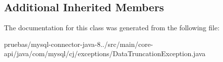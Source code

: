\subsection*{Additional Inherited Members}


The documentation for this class was generated from the following file\+:\begin{DoxyCompactItemize}
\item 
pruebas/mysql-\/connector-\/java-\/8../src/main/core-\/api/java/com/mysql/cj/exceptions/Data\+Truncation\+Exception.\+java\end{DoxyCompactItemize}
